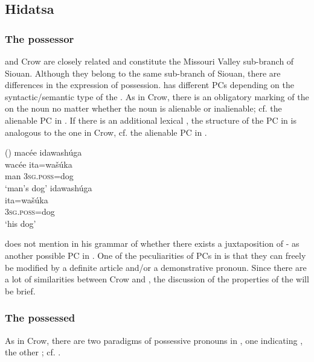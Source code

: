 \documentclass[output=paper]{LSP/langsci}
\begin{document}
\subsection{Hidatsa}\label{sec:helmbrecht:4.2} \label{hidatsa} 
\subsubsection{The possessor}
 and Crow are closely related and constitute the Missouri Valley sub-branch of Siouan. Although they belong to the same sub-branch of Siouan, there are differences in the expression of possession.  has different PCs depending on the syntactic/semantic type of the . As in Crow, there is an obligatory marking of the  on the  noun no matter whether the  noun is alienable or inalienable; cf. the alienable PC in . If there is an additional lexical , the structure of the PC in  is analogous to the one in Crow, cf. the alienable PC in .

\newpage
\ea {} (\citealt[81]{Boyle2007})
\ea \label{hidatsamansdog}
\glll macée idawashúga \\ 
wacée ita=wašúka \\
man  \textsc{3sg.poss}=dog \\
\glt `man's dog'
\ex \label{hidatsahisdog}
\glll idawashúga \\
ita=wašúka \\
\textsc{3sg.poss}=dog \\
\glt `his dog'
\z \z

\citet{Boyle2007} does not mention in his grammar of  whether there exists a juxtaposition of - as another possible PC in . One of the peculiarities of PCs in  is that they can freely be modified by a definite article and/or a demonstrative pronoun. Since there are a lot of similarities between Crow and , the discussion of the properties of the  will be brief.

\subsubsection{The possessed}

As in Crow, there are two paradigms of possessive pronouns in , one indicating , the other ; cf. .
\end{document}
